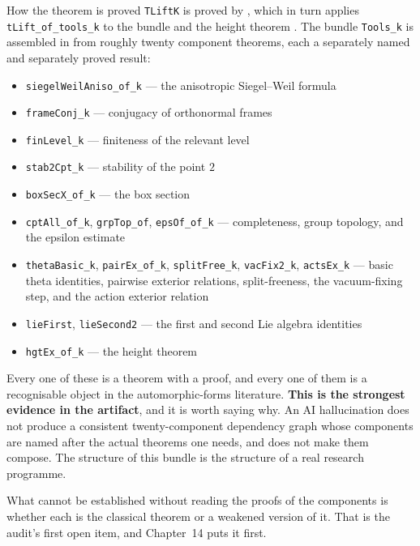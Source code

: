 \begin{seamnote}{How the theorem is proved}
\texttt{TLiftK} is proved by , which in
turn applies \texttt{tLift\_of\_tools\_k} to the bundle
 and the height theorem
. The bundle
\texttt{Tools\_k} is assembled in
 from roughly twenty component
theorems, each a separately named and separately proved result:

\begin{itemize}
\item \texttt{siegelWeilAniso\_of\_k} --- the anisotropic Siegel--Weil formula
\item \texttt{frameConj\_k} --- conjugacy of orthonormal frames
\item \texttt{finLevel\_k} --- finiteness of the relevant level
\item \texttt{stab2Cpt\_k} --- stability of the point $2$
\item \texttt{boxSecX\_of\_k} --- the box section
\item \texttt{cptAll\_of\_k}, \texttt{grpTop\_of}, \texttt{epsOf\_of\_k} ---
completeness, group topology, and the epsilon estimate
\item \texttt{thetaBasic\_k}, \texttt{pairEx\_of\_k}, \texttt{splitFree\_k},
\texttt{vacFix2\_k}, \texttt{actsEx\_k} --- basic theta identities, pairwise
exterior relations, split-freeness, the vacuum-fixing step, and the action
exterior relation
\item \texttt{lieFirst}, \texttt{lieSecond2} --- the first and second Lie
algebra identities
\item \texttt{hgtEx\_of\_k} --- the height theorem
\end{itemize}

Every one of these is a theorem with a proof, and every one of them is a
recognisable object in the automorphic-forms literature. \textbf{This is the
strongest evidence in the artifact}, and it is worth saying why. An AI
hallucination does not produce a consistent twenty-component dependency graph
whose components are named after the actual theorems one needs, and does not
make them compose. The structure of this bundle is the structure of a real
research programme.
\end{seamnote}

What cannot be established without reading the proofs of the components is
whether each is the classical theorem or a weakened version of it. That is
the audit's first open item, and Chapter~14 puts it first.

